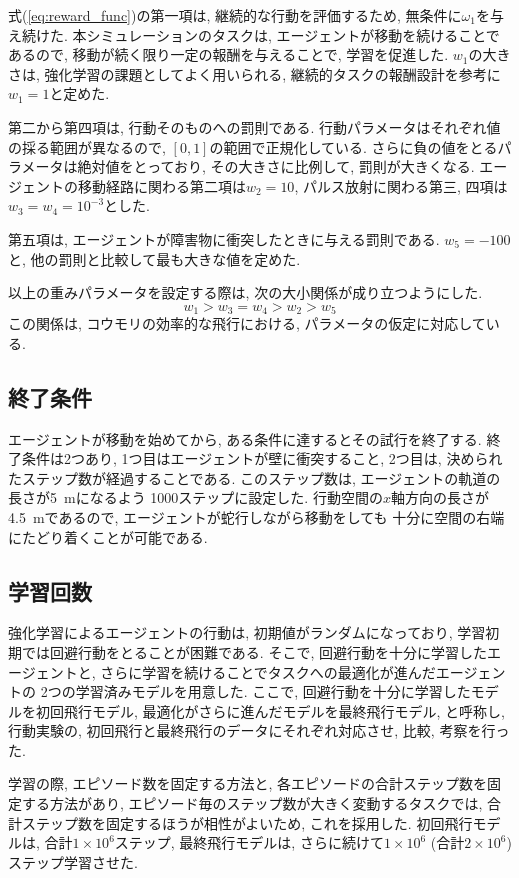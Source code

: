 \documentclass[../main]{subfiles}
\begin{document}
式(\ref{eq:reward_func})の第一項は, 
継続的な行動を評価するため, 無条件に$\omega_1$を与え続けた.
本シミュレーションのタスクは, 
エージェントが移動を続けることであるので, 
移動が続く限り一定の報酬を与えることで, 学習を促進した.
$w_1$の大きさは, 強化学習の課題としてよく用いられる, 
継続的タスクの報酬設計を参考に$w_1=1$と定めた.

第二から第四項は, 行動そのものへの罰則である.
行動パラメータはそれぞれ値の採る範囲が異なるので, 
$[0, 1]$の範囲で正規化している.
さらに負の値をとるパラメータは絶対値をとっており, 
その大きさに比例して, 罰則が大きくなる.
エージェントの移動経路に関わる第二項は$w_2=10$, 
パルス放射に関わる第三, 四項は$w_3=w_4=10^{-3}$とした. 

第五項は, エージェントが障害物に衝突したときに与える罰則である.
$w_5=-100$と, 他の罰則と比較して最も大きな値を定めた.

以上の重みパラメータを設定する際は, 
次の大小関係が成り立つようにした.
$$
w_1>w_3=w_4>w_2>w_5
$$
この関係は, コウモリの効率的な飛行における, 
パラメータの仮定に対応している.


\subsection{終了条件}
エージェントが移動を始めてから, 
ある条件に達するとその試行を終了する.
終了条件は2つあり, 1つ目はエージェントが壁に衝突すること, 
2つ目は, 決められたステップ数が経過することである.
このステップ数は, エージェントの軌道の長さが\SI{5}{\metre}になるよう
1000ステップに設定した. 
行動空間の$x$軸方向の長さが\SI{4.5}{\metre}であるので, 
エージェントが蛇行しながら移動をしても
十分に空間の右端にたどり着くことが可能である.


\subsection{学習回数}
強化学習によるエージェントの行動は, 
初期値がランダムになっており, 
学習初期では回避行動をとることが困難である.
そこで, 回避行動を十分に学習したエージェントと, 
さらに学習を続けることでタスクへの最適化が進んだエージェントの
2つの学習済みモデルを用意した.
ここで, 回避行動を十分に学習したモデルを初回飛行モデル, 
最適化がさらに進んだモデルを最終飛行モデル, と呼称し, 
行動実験の, 初回飛行と最終飛行のデータにそれぞれ対応させ, 
比較, 考察を行った.

学習の際, エピソード数を固定する方法と, 
各エピソードの合計ステップ数を固定する方法があり, 
エピソード毎のステップ数が大きく変動するタスクでは, 
合計ステップ数を固定するほうが相性がよいため, これを採用した. 
初回飛行モデルは, 合計$1\times 10^6$ステップ,
最終飛行モデルは, さらに続けて$1\times 10^6$
(合計$2\times 10^6$)ステップ学習させた.
\end{document}
